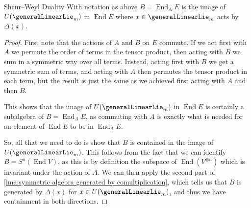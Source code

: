 \documentclass[fleqn]{NotesClass}
\DeclareMathOperator{\End}{End}
\begin{document}
    \begin{prp}{Shcur--Weyl Duality}{}
        With notation as above \(B = \End_A E\) is the image of \(U(\generalLinearLie_m)\) in \(\End E\) where \(x \in \generalLinearLie_m\) acts by \(\Delta(x)\).
        \begin{proof}
            First note that the actions of \(A\) and \(B\) on \(E\) commute.
            If we act first with \(A\) we permute the order of terms in the tensor product, then acting with \(B\) we sum in a symmetric way over all terms.
            Instead, acting first with \(B\) we get a symmetric sum of terms, and acting with \(A\) then permutes the tensor product in each term, but the result is just the same as we achieved first acting with \(A\) and then \(B\).
            
            This shows that the image of \(U(\generalLinearLie_m)\) in \(\End E\) is certainly a subalgebra of \(B = \End_A E\), as commuting with \(A\) is exactly what is needed for an element of \(\End E\) to be in \(\End_A E\).
            
            So, all that we need to do is show that \(B\) is contained in the image of \(U(\generalLinearLie_m)\).
            This follows from the fact that we can identify \(B = S^n(\End V)\), as this is by definition the subspace of \(\End (V^{\otimes n})\) which is invariant under the action of \(A\).
            We can then apply the second part of \cref{lma:symmetric algebra generated by comultiplication}, which tells us that \(B\) is generated by \(\Delta(x)\) for \(x \in U(\generalLinearLie_m)\), and thus we have containment in both directions.
        \end{proof}
    \end{prp}
    
\end{document}
